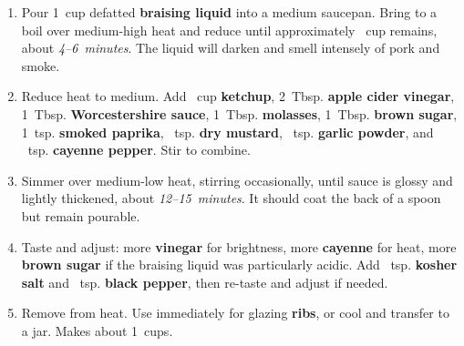 \documentclass[11pt,letterpaper]{article}
\begin{document}
\begin{enumerate}
    \item Pour 1~cup defatted \textbf{braising liquid} into a medium saucepan. Bring to a boil over medium-high heat and reduce until approximately ~cup remains, about \textit{4--6~minutes}. The liquid will darken and smell intensely of pork and smoke.

    \item Reduce heat to medium. Add ~cup \textbf{ketchup}, 2~Tbsp. \textbf{apple cider vinegar}, 1~Tbsp. \textbf{Worcestershire sauce}, 1~Tbsp. \textbf{molasses}, 1~Tbsp. \textbf{brown sugar}, 1~tsp. \textbf{smoked paprika}, ~tsp. \textbf{dry mustard}, ~tsp. \textbf{garlic powder}, and ~tsp. \textbf{cayenne pepper}. Stir to combine.

    \item Simmer over medium-low heat, stirring occasionally, until sauce is glossy and lightly thickened, about \textit{12--15~minutes}. It should coat the back of a spoon but remain pourable.

    \item Taste and adjust: more \textbf{vinegar} for brightness, more \textbf{cayenne} for heat, more \textbf{brown sugar} if the braising liquid was particularly acidic. Add ~tsp. \textbf{kosher salt} and ~tsp. \textbf{black pepper}, then re-taste and adjust if needed.

    \item Remove from heat. Use immediately for glazing \textbf{ribs}, or cool and transfer to a jar. Makes about 1~cups.
\end{enumerate}

\newpage
\end{document}
